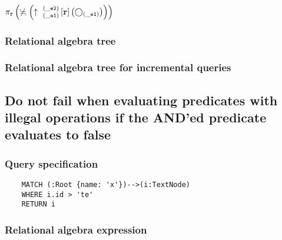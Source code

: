 	$\projection{\var{r}} \left(\alldifferent{} \left(\expandout{\_e1}{\_e2}{}{r}{} \left(\getvertices{\_e1}{}\right)\right)\right)$

	\subsubsection*{Relational algebra tree}


	\subsubsection*{Relational algebra tree for incremental queries}

	\subsection{Do not fail when evaluating predicates with illegal operations if the AND'ed predicate evaluates to false}

	\subsubsection*{Query specification}

	\begin{lstlisting}
	MATCH (:Root {name: 'x'})-->(i:TextNode)
	WHERE i.id > 'te'
	RETURN i
	\end{lstlisting}


	\subsubsection*{Relational algebra expression}

